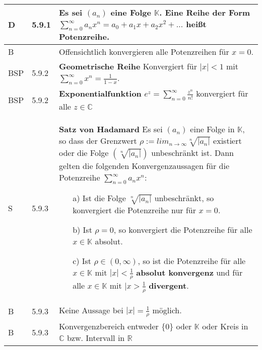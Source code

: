     \begin{longtable}{p{0.75cm} p{1cm} p{16cm}}
        \toprule

        D   & 5.9.1 &   Es sei $(a_n)$ eine Folge $\mathbb{K}$. Eine Reihe der Form $\sum^{\infty}_{n=0} a_n x^n = a_0 + a_1x+a_2x^2+ \dots$ 
                        heißt \textbf{Potenzreihe}. \\
        \midrule
        B   &       &   Offensichtlich konvergieren alle Potenzreihen für $x = 0$. \\
        \midrule
        BSP & 5.9.2 &   \textbf{Geometrische Reihe} \hfill \break 
                        Konvergiert für $|x| < 1$ mit $\sum^{\infty}_{n=0} x^n = \frac{1}{1-x}$. \\
        \midrule
        BSP & 5.9.2 &   \textbf{Exponentialfunktion} \hfill \break
                        $e^z = \sum^{\infty}_{n=0} \frac{z^n}{n!}$ konvergiert für alle $z \in \mathbb{C}$ \\ 
        \midrule
        S   & 5.9.3 &   \textbf{Satz von Hadamard} \hfill \break
                        Es sei $(a_n)$ eine Folge in $\mathbb{K}$, so dass der Grenzwert $\rho := lim_{n \rightarrow \infty} \sqrt[n]{|a_n|}$ existiert
                        oder die Folge $(\sqrt[n]{|a_n|})$ unbeschränkt ist. Dann gelten die folgenden Konvergenzaussagen für die Potenzreihe 
                        $\sum^{\infty}_{n=0} a_n x^n$:
                        \begin{itemize}[topsep=-0.5cm]
                            \item[a)] Ist die Folge $\sqrt[n]{|a_n|}$ unbeschränkt, so konvergiert die Potenzreihe nur für \textbf{$x = 0$}.
                            \item[b)] Ist $\rho = 0$, so konvergiert die Potenzreihe für alle $x \in \mathbb{K}$ absolut. 
                            \item[c)] Ist $\rho \in (0, \infty)$, so ist die Potenzreihe für alle $x \in \mathbb{K}$ mit $|x|< \frac{1}{\rho}$
                                        \textbf{absolut konvergenz} und für alle $x \in \mathbb{K}$ mit $|x > \frac{1}{\rho}$ \textbf{divergent}.
                        \end{itemize} \vspace{-0cm} \\
        \midrule
        B   & 5.9.3 &   Keine Aussage bei $|x|=\frac{1}{\rho}$ möglich. \\
        \midrule
        B   & 5.9.3 &   Konvergenzbereich entweder $\{0\}$ oder $\mathbb{K}$ oder Kreis in $\mathbb{C}$ bzw. Intervall in $\mathbb{R}$ \\

\end{longtable}
